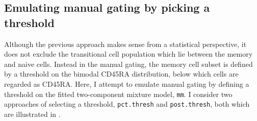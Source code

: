 \subsection{Emulating manual gating by picking a threshold}

Although the previous approach makes sense from a statistical perspective, it does not exclude the transitional cell population which lie
between the memory and naive cells.
Instead in the manual gating, the memory cell subset is defined by a threshold on the bimodal CD45RA distribution, below which cells are regarded as CD45RA\negative.
Here, I attempt to emulate manual gating by defining a threshold on the fitted two-component mixture model, \texttt{mm}.
I consider two approaches of selecting a threshold, \texttt{pct.thresh} and \texttt{post.thresh}, both which are illustrated in .


